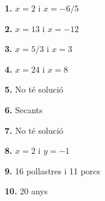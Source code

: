 \documentclass[a4paper, pdf, twoside]{book}
\begin{document}
\begin{multicols}{2}
\begin{enumerate}
\vspace{0.25cm}
\item[\fontfamily{phv}\selectfont\color{blue}\textbf{1. }]  \scalebox{0.6}{\simbolclau } 
$x=2$ i $x=-6/5$
\vspace{0.25cm}
\item[\fontfamily{phv}\selectfont\color{blue}\textbf{2. }]  \scalebox{0.6}{\simbolclau } 
$x=13$ i $x=-12$
\vspace{0.25cm}
\item[\fontfamily{phv}\selectfont\color{blue}\textbf{3. }]  \scalebox{0.6}{\simbolclau } 
$x=5/3$ i $x=3$
\vspace{0.25cm}
\item[\fontfamily{phv}\selectfont\color{blue}\textbf{4. }]  \scalebox{0.6}{\simbolclau } 
$x=24$ i $x=8$
\vspace{0.25cm}
\item[\fontfamily{phv}\selectfont\color{blue}\textbf{5. }]  \scalebox{0.6}{\simbolclau } 
No té solució
\vspace{0.25cm}
\item[\fontfamily{phv}\selectfont\color{blue}\textbf{6. }]  \scalebox{0.6}{\simbolclau } 
Secants
\vspace{0.25cm}
\item[\fontfamily{phv}\selectfont\color{blue}\textbf{7. }]  \scalebox{0.6}{\simbolclau } 
No té solució
\vspace{0.25cm}
\item[\fontfamily{phv}\selectfont\color{blue}\textbf{8. }]  \scalebox{0.6}{\simbolclau } 
$x=2$ i $y=-1$
\vspace{0.25cm}
\item[\fontfamily{phv}\selectfont\color{blue}\textbf{9. }]  \scalebox{0.6}{\simbolclau } 
16 pollastres i 11 porcs
\vspace{0.25cm}
\item[\fontfamily{phv}\selectfont\color{blue}\textbf{10. }]  \scalebox{0.6}{\simbolclau } 
20 anys
 \end{enumerate}
\vfill\null
\columnbreak
\def\currentname{Solucions del Tema 7}
\vspace*{0.75cm}

 

\vspace*{0.4cm}
 {}
\vspace{0.3cm}



\end{multicols}
\end{document}
